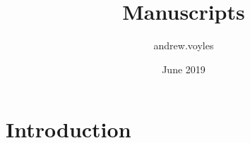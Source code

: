 \documentclass{article}
\title{Manuscripts}
\author{andrew.voyles }
\date{June 2019}
\begin{document}
\maketitle

\section{Introduction}
\end{document}
